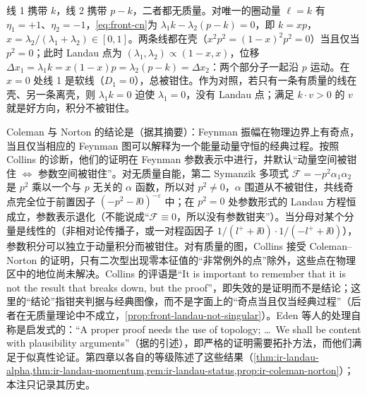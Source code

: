 \begin{example}[无质量自能的共线钳夹]\label{ex:front-collinear-pinch}
线 1 携带 $k$，线 2 携带 $p-k$，二者都无质量。对唯一的圈动量 $\ell=k$ 有 $\eta_1=+1$、$\eta_2=-1$，\cref{eq:front-cn}为 $\lambda_1k-\lambda_2(p-k)=0$，即 $k=xp$，$x=\lambda_2/(\lambda_1+\lambda_2)\in[0,1]$。两条线都在壳（$x^2p^2=(1-x)^2p^2=0$）当且仅当 $p^2=0$；此时 Landau 点为 $(\lambda_1,\lambda_2)\propto(1-x,x)$，位移 $\Delta x_1=\lambda_1k=x(1-x)p=\lambda_2(p-k)=\Delta x_2$：两个部分子一起沿 $p$ 运动。在 $x=0$ 处线 1 是软线（$D_1=0$），总被钳住。作为对照，若只有一条有质量的线在壳、另一条离壳，则 $\lambda_1k=0$ 迫使 $\lambda_1=0$，没有 Landau 点；满足 $k\cdot v>0$ 的 $v$ 就是好方向，积分不被钳住。
\end{example}

\begin{remark}\label{rem:front-cn-history}
Coleman 与 Norton 的结论是（据其摘要）：Feynman 振幅在物理边界上有奇点，当且仅当相应的 Feynman 图可以解释为一个能量动量守恒的经典过程\cite{ColemanNorton1965}。按照 Collins 的诊断\cite[第~I、IV~节，附录~D]{Collins:2020euz}，他们的证明在 Feynman 参数表示中进行，并默认“动量空间被钳住 $\Leftrightarrow$ 参数空间被钳住”。对无质量自能，第二 Symanzik 多项式 $\mathcal F=-p^2\alpha_1\alpha_2$ 是 $p^2$ 乘以一个与 $p$ 无关的 $\alpha$ 函数，所以对 $p^2\ne0$，$\alpha$ 围道从不被钳住，共线奇点完全位于前置因子 $(-p^2-\ii0)^{-\varepsilon}$ 中；在 $p^2=0$ 处参数形式的 Landau 方程恒成立，参数表示退化（不能说成“$\mathcal F\equiv0$，所以没有参数钳夹”）。当分母对某个分量是线性的（非相对论传播子，或一对程函因子 $1/(l^++\ii0)\cdot1/(-l^++\ii0)$），参数积分可以独立于动量积分而被钳住\cite[附录~D.2]{Collins:2020euz}。对有质量的图，Collins 接受 Coleman--Norton 的证明，只有二次型出现零本征值的“非常例外的点”除外，这些点在物理区中的地位尚未解决。Collins 的评语是“It is important to remember that it is not the result that breaks down, but the proof”\cite[第~IV~节]{Collins:2020euz}，即失效的是证明而不是结论；这里的“结论”指钳夹判据与经典图像，而不是字面上的“奇点当且仅当经典过程”（后者在无质量理论中不成立，\cref{prop:front-landau-not-singular}）。Eden 等人的处理自称是启发式的：“A proper proof needs the use of topology; \dots\ We shall be content with plausibility arguments”\cite[第~48~页]{EdenEtAl1966}（据\cite[第~5.4.3~节]{Collins2011}的引述），即严格的证明需要拓扑方法，而他们满足于似真性论证。第四章以各自的等级陈述了这些结果（\cref{thm:ir-landau-alpha,thm:ir-landau-momentum,rem:ir-landau-status,prop:ir-coleman-norton}）；本注只记录其历史。
\end{remark}

